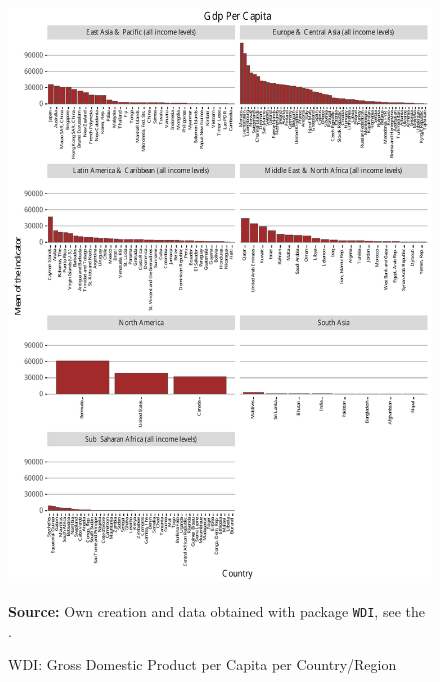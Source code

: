 \begin{figure}[H]
\begin{center}
\caption{WDI: Gross Domestic Product per Capita per Country/Region}
\label{fig_wdi_gdp}
\includegraphics[max height=.9\textheight]{../img/wdi_gdp_per_capita.pdf}
\end{center}
\noindent \footnotesize{\textbf{Source:} Own creation and data obtained with package \texttt{WDI}, see the \cite{wb_r}.}
\end{figure}

